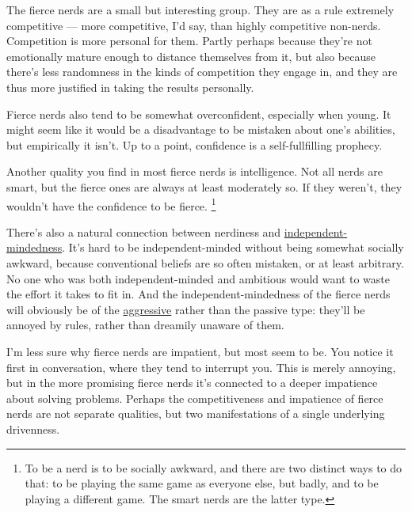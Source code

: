 \documentclass[12pt]{book}
\begin{document}
The fierce nerds are a small but interesting group. They are as a rule
extremely competitive --- more competitive, I'd say, than highly
competitive non-nerds. Competition is more personal for them. Partly
perhaps because they're not emotionally mature enough to distance
themselves from it, but also because there's less randomness in the
kinds of competition they engage in, and they are thus more justified in
taking the results personally.

Fierce nerds also tend to be somewhat overconfident, especially when
young. It might seem like it would be a disadvantage to be mistaken
about one's abilities, but empirically it isn't. Up to a point,
confidence is a self-fullfilling prophecy.

Another quality you find in most fierce nerds is intelligence. Not all
nerds are smart, but the fierce ones are always at least moderately so.
If they weren't, they wouldn't have the confidence to be fierce.
\footnote{To be a nerd is to be socially awkward, and there are two
distinct ways to do that: to be playing the same game as everyone else,
but badly, and to be playing a different game. The smart nerds are the
latter type.}

There's also a natural connection between nerdiness and
\href{think.html}{independent-mindedness}. It's hard to be
independent-minded without being somewhat socially awkward, because
conventional beliefs are so often mistaken, or at least arbitrary. No
one who was both independent-minded and ambitious would want to waste
the effort it takes to fit in. And the independent-mindedness of the
fierce nerds will obviously be of the \href{conformism.html}{aggressive}
rather than the passive type: they'll be annoyed by rules, rather than
dreamily unaware of them.

I'm less sure why fierce nerds are impatient, but most seem to be. You
notice it first in conversation, where they tend to interrupt you. This
is merely annoying, but in the more promising fierce nerds it's
connected to a deeper impatience about solving problems. Perhaps the
competitiveness and impatience of fierce nerds are not separate
qualities, but two manifestations of a single underlying drivenness.
\end{document}
